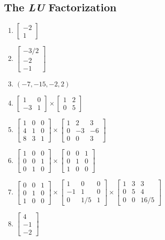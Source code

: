 \documentclass{article}
\newcommand{\colvecTwo}[2]{
  \begin{bmatrix}
    #1 \\
    #2
  \end{bmatrix}
}
\newcommand{\colvecThree}[3]{
  \begin{bmatrix}
    #1 \\
    #2 \\
    #3
  \end{bmatrix}
}
\begin{document}
\subsection{The \textit{LU} Factorization}
\begin{enumerate}
	\item $\colvecTwo{-2}{1}$
	      \setcounter{enumi}{2}
	\item $\colvecThree{-3/2}{-2}{-1}$
	      \setcounter{enumi}{4}
	\item $(-7, -15, -2, 2)$
	      \setcounter{enumi}{6}
	\item $
		      \begin{bmatrix}
			      1  & 0 \\
			      -3 & 1
		      \end{bmatrix}\times
		      \begin{bmatrix}
			      1 & 2 \\
			      0 & 5
		      \end{bmatrix}$
	      \setcounter{enumi}{8}
	\item $
		      \begin{bmatrix}
			      1 & 0 & 0 \\
			      4 & 1 & 0 \\
			      8 & 3 & 1
		      \end{bmatrix}\times
		      \begin{bmatrix}
			      1 & 2  & 3  \\
			      0 & -3 & -6 \\
			      0 & 0  & 3
		      \end{bmatrix}$
	      \setcounter{enumi}{18}
	\item $
		      \begin{bmatrix}
			      1 & 0 & 0 \\
			      0 & 0 & 1 \\
			      0 & 1 & 0
		      \end{bmatrix}\times
		      \begin{bmatrix}
			      0 & 0 & 1 \\
			      0 & 1 & 0 \\
			      1 & 0 & 0
		      \end{bmatrix}$
	      \setcounter{enumi}{22}
	\item $
		      \begin{bmatrix}
			      0 & 0 & 1 \\
			      0 & 1 & 0 \\
			      1 & 0 & 0
		      \end{bmatrix}\times
		      \begin{bmatrix}
			      1  & 0   & 0 \\
			      -1 & 1   & 0 \\
			      0  & 1/5 & 1
		      \end{bmatrix}\times
		      \begin{bmatrix}
			      1 & 3 & 3    \\
			      0 & 5 & 4    \\
			      0 & 0 & 16/5
		      \end{bmatrix}$
	      \setcounter{enumi}{26}
	\item $\colvecThree{4}{-1}{-2}$
\end{enumerate}
\end{document}
